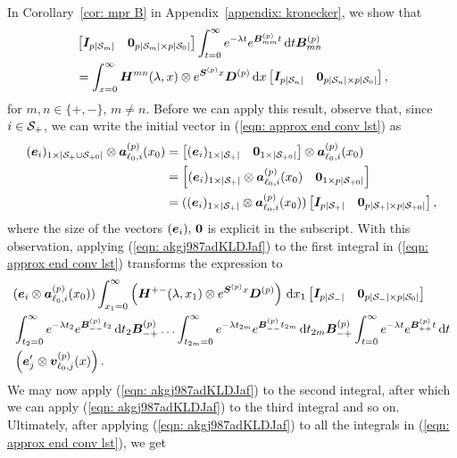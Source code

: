 In Corollary~\ref{cor: mpr B} in Appendix~\ref{appendix: kronecker}, we show that
\begin{align}
	&\begin{bmatrix} \boldsymbol I_{p|\mathcal{S}_m|} & \boldsymbol 0_{p|\mathcal{S}_m|\times p|\mathcal{S}_0|}  \end{bmatrix}\int_{t=0}^\infty e^{-\lambda t} e^{\boldsymbol{B}^{(p)}_{mm}t} \, \mathrm{d} t \boldsymbol{B}^{(p)}_{m{n}} \nonumber 
	\\&= \int_{x=0}^\infty \boldsymbol H^{mn}(\lambda,x)  \otimes  e^{\boldsymbol S^{(p)} x}\boldsymbol D^{(p)}\, \mathrm{d} x \begin{bmatrix} \boldsymbol I_{p|\mathcal{S}_n|} & \boldsymbol 0_{p|\mathcal{S}_n|\times p|\mathcal{S}_0|} \end{bmatrix}, \label{eqn: akgj987adKLDJaf}
\end{align}
for \(m,n\in\{+,-\}\), \(m\neq n\). Before we can apply this result, observe that, since \(i\in\mathcal{S}_+\), we can write the initial vector in (\ref{eqn: approx end conv lst}) as 
\begin{align}
	(\boldsymbol e_i)_{1\times |\mathcal{S}_+\cup\mathcal{S}_{+0}|}\otimes \boldsymbol  a_{\ell_0,i}^{(p)}(x_0) &= 
	\begin{bmatrix} (\boldsymbol e_i)_{1\times |\mathcal{S}_+|} & \boldsymbol 0_{1\times |\mathcal{S}_{+0}|} \end{bmatrix} \otimes \boldsymbol  a_{\ell_0,i}^{(p)}(x_0) \nonumber 
	\\&= \begin{bmatrix} (\boldsymbol e_i)_{1\times |\mathcal{S}_+|}\otimes \boldsymbol  a_{\ell_0,i}^{(p)}(x_0)  & \boldsymbol 0_{1\times p|\mathcal{S}_{+0}|} \end{bmatrix} \nonumber 
	\\&= ((\boldsymbol e_i)_{1\times |\mathcal{S}_+|}\otimes \boldsymbol  a_{\ell_0,i}^{(p)}(x_0))\begin{bmatrix} \boldsymbol I_{p|\mathcal{S}_+|} & \boldsymbol 0_{p|\mathcal{S}_+|\times p|\mathcal{S}_{+0}|} \end{bmatrix},
\end{align}
where the size of the vectors \((\boldsymbol e_i),\, \boldsymbol 0\) is explicit in the subscript. 
With this observation, applying (\ref{eqn: akgj987adKLDJaf}) to the first integral in (\ref{eqn: approx end conv lst}) transforms the expression to 
\begin{align}
	&(\boldsymbol e_i\otimes \boldsymbol  a_{\ell_0,i}^{(p)}(x_0)) \int_{x_1=0}^\infty \left(\boldsymbol H^{+{-}}(\lambda,x_1) \otimes e^{\boldsymbol S^{(p)} x}\boldsymbol D^{(p)}\right) \, \mathrm{d} x_1 \begin{bmatrix} \boldsymbol I_{p|\mathcal{S}_-|} & \boldsymbol 0_{p|\mathcal{S}_-|\times p|\mathcal{S}_0|} \end{bmatrix} \nonumber
	\\&\int_{t_2=0}^\infty e^{-\lambda t_2} e^{\boldsymbol{B}^{(p)}_{--}t_2} \, \mathrm{d} t_2\boldsymbol{B}^{(p)}_{-{+}} 
	\hdots 
	\int_{t_{2m}=0}^\infty e^{-\lambda t_{2m}}e^{\boldsymbol{B}^{(p)}_{--}t_{2m}} \, \mathrm{d} t_{2m}\boldsymbol{B}^{(p)}_{-{+}} 
	\int_{t=0}^\infty e^{-\lambda t}e^{\boldsymbol{B}^{(p)}_{++}t} \, \mathrm{d} t \nonumber
	\\&\left(\boldsymbol e_j'{} \otimes {\boldsymbol v}_{\ell_0,j}^{(p)}( x)\right). \label{eqn: approx end conv lst2}
\end{align}
We may now apply (\ref{eqn: akgj987adKLDJaf}) to the second integral, after which we can apply (\ref{eqn: akgj987adKLDJaf}) to the third integral and so on. Ultimately, after applying (\ref{eqn: akgj987adKLDJaf}) to all the integrals in (\ref{eqn: approx end conv lst}), we get 
